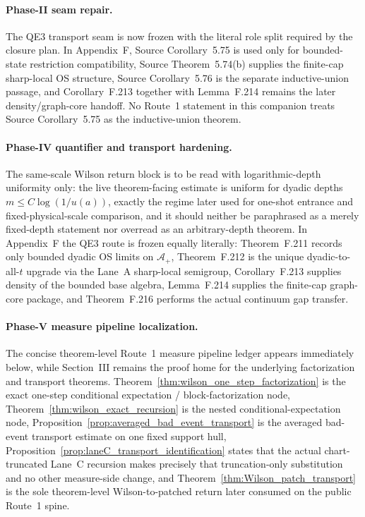 \documentclass[preprint,aip,jmp,amsmath,amssymb,nofootinbib]{revtex4-2}
\begin{document}
\paragraph{Phase-II seam repair.}
The QE3 transport seam is now frozen with the literal role split required by the closure plan. In Appendix~F, Source Corollary~5.75 is used only for bounded-state restriction compatibility, Source Theorem~5.74(b) supplies the finite-cap sharp-local OS structure, Source Corollary~5.76 is the separate inductive-union passage, and Corollary~F.213 together with Lemma~F.214 remains the later density/graph-core handoff. No Route~1 statement in this companion treats Source Corollary~5.75 as the inductive-union theorem.

\paragraph{Phase-IV quantifier and transport hardening.}
The same-scale Wilson return block is to be read with logarithmic-depth uniformity only: the live theorem-facing estimate is uniform for dyadic depths $m\le C\log(1/u(a))$, exactly the regime later used for one-shot entrance and fixed-physical-scale comparison, and it should neither be paraphrased as a merely fixed-depth statement nor overread as an arbitrary-depth theorem. In Appendix~F the QE3 route is frozen equally literally: Theorem~F.211 records only bounded dyadic OS limits on $\mathcal A_+$, Theorem~F.212 is the unique dyadic-to-all-$t$ upgrade via the Lane~A sharp-local semigroup, Corollary~F.213 supplies density of the bounded base algebra, Lemma~F.214 supplies the finite-cap graph-core package, and Theorem~F.216 performs the actual continuum gap transfer.

\paragraph{Phase-V measure pipeline localization.}
The concise theorem-level Route~1 measure pipeline ledger appears immediately below, while Section~III remains the proof home for the underlying factorization and transport theorems. Theorem~\ref{thm:wilson_one_step_factorization} is the exact one-step conditional expectation / block-factorization node, Theorem~\ref{thm:wilson_exact_recursion} is the nested conditional-expectation node, Proposition~\ref{prop:averaged_bad_event_transport} is the averaged bad-event transport estimate on one fixed support hull, Proposition~\ref{prop:laneC_transport_identification} states that the actual chart-truncated Lane~C recursion makes precisely that truncation-only substitution and no other measure-side change, and Theorem~\ref{thm:Wilson_patch_transport} is the sole theorem-level Wilson-to-patched return later consumed on the public Route~1 spine.
\end{document}
